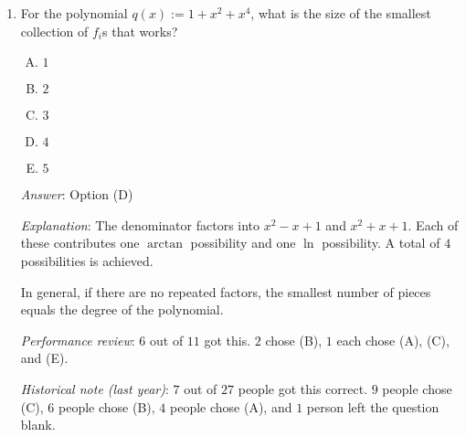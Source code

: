 \documentclass[10pt]{amsart}
\begin{document}
\begin{enumerate}
  {\em Performance review}: $10$ out of $11$ got this. $1$ chose (E).

  {\em Historical note (last year)}: $15$ out of $27$ people got this
  correct. $7$ people chose (A), $2$ people chose (C), $1$ person each
  chose (A) and (E), and $1$ person left the question blank.
\item For the polynomial $q(x) := 1 + x^2 + x^4$, what is the size of
  the smallest collection of $f_i$s that works?

  \begin{enumerate}[(A)]
  \item $1$
  \item $2$
  \item $3$
  \item $4$
  \item $5$
  \end{enumerate}

  {\em Answer}: Option (D)

  {\em Explanation}: The denominator factors into $x^2 - x + 1$ and
  $x^2 + x + 1$. Each of these contributes one $\arctan$ possibility
  and one $\ln$ possibility. A total of $4$ possibilities is achieved.

  In general, if there are no repeated factors, the smallest number of
  pieces equals the degree of the polynomial.

  {\em Performance review}: $6$ out of $11$ got this. $2$ chose (B),
  $1$ each chose (A), (C), and (E).

  {\em Historical note (last year)}: $7$ out of $27$ people got this
  correct. $9$ people chose (C), $6$ people chose (B), $4$ people
  chose (A), and $1$ person left the question blank.
\end{enumerate}
\end{document}
